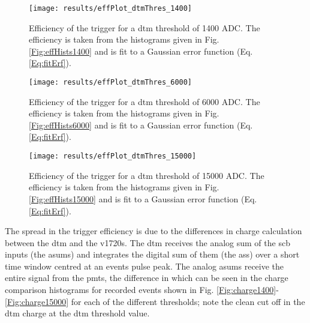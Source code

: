 \clearpage
\begin{figure}
\centering
\texttt{[image: results/effPlot\_dtmThres\_1400]}
\caption{Efficiency of the trigger for a \gls{dtm} threshold of 1400 ADC. The efficiency is taken from the histograms given in Fig. \ref{Fig:effHists1400} and is fit to a Gaussian error function (Eq. \eqref{Eq:fitErf}).}
\label{Fig:effFit1400}
\end{figure}
\clearpage
\begin{figure}
\centering
\texttt{[image: results/effPlot\_dtmThres\_6000]}
\caption{Efficiency of the trigger for a \gls{dtm} threshold of 6000 ADC. The efficiency is taken from the histograms given in Fig. \ref{Fig:effHists6000} and is fit to a Gaussian error function (Eq. \eqref{Eq:fitErf}).}
\label{Fig:effFit6000}
\end{figure}
\clearpage
\begin{figure}
\centering
\texttt{[image: results/effPlot\_dtmThres\_15000]}
\caption{Efficiency of the trigger for a \gls{dtm} threshold of 15000 ADC. The efficiency is taken from the histograms given in Fig. \ref{Fig:effHists15000} and is fit to a Gaussian error function (Eq. \eqref{Eq:fitErf}).}
\label{Fig:effFit15000}
\end{figure}
\clearpage
The spread in the trigger efficiency is due to the differences in charge calculation between the \gls{dtm} and the \gls{v1720}s. The \gls{dtm} receives the analog sum of the \gls{scb} inputs (the \gls{asum}s) and integrates the digital sum of them (the \gls{ass}) over a short time window centred at an events pulse peak. The analog \gls{asum}s receive the entire signal from the \gls{pmt}s, the difference in which can be seen in the charge comparison histograms for recorded events shown in Fig. \ref{Fig:charge1400}-\ref{Fig:charge15000} for each of the different thresholds; note the clean cut off in the \gls{dtm} charge at the \gls{dtm} threshold value.

